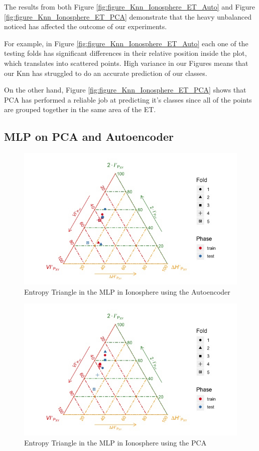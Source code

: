 The results from both Figure \ref{fig:figure_Knn_Ionosphere_ET_Auto} and Figure \ref{fig:figure_Knn_Ionosphere_ET_PCA} demonstrate that the heavy unbalanced noticed has affected the outcome of our experiments.\par
For example, in Figure \ref{fig:figure_Knn_Ionosphere_ET_Auto} each one of the testing folds has significant differences in their relative position inside the plot, which translates into scattered points. High variance in our Figures means that our Knn has struggled to do an accurate prediction of our classes.

On the other hand, Figure \ref{fig:figure_Knn_Ionosphere_ET_PCA} shows that PCA has performed a reliable job at predicting it's classes since all of the points are grouped together in the same area of the ET.

\subsection{MLP on PCA and Autoencoder}

\begin{figure}[H]
	\centering
	\includegraphics[width=1\linewidth]{Figuras_tfg/ET_mlp_Ionosphere_auto}
	\caption{Entropy Triangle in the MLP in Ionosphere using the Autoencoder}
	\label{fig:figure_MLP_Ionosphere_ET_Auto}
\end{figure}

\begin{figure}[H]
	\centering
	\includegraphics[width=1\linewidth]{Figuras_tfg/ET_mlp_Ionosphere_pca}
	\caption{Entropy Triangle in the MLP in Ionosphere using the PCA}
	\label{fig:figure_MLP_Ionosphere_ET_PCA}
\end{figure}

